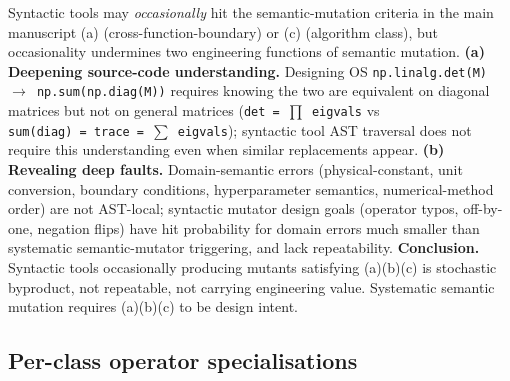 \documentclass[manuscript,screen,review]{acmart}
\begin{document}
Syntactic tools may \emph{occasionally} hit the semantic-mutation criteria in the main manuscript (a)
(cross-function-boundary) or (c) (algorithm class), but occasionality
undermines two engineering functions of semantic mutation. \textbf{(a)
Deepening source-code understanding.} Designing OS
\texttt{np.linalg.det(M)\ $\to$\ np.sum(np.diag(M))} requires knowing the
two are equivalent on diagonal matrices but not on general matrices
(\texttt{det\ =\ $\prod$\ eigvals} vs
\texttt{sum(diag)\ =\ trace\ =\ $\sum$\ eigvals}); syntactic tool AST
traversal does not require this understanding even when similar
replacements appear. \textbf{(b) Revealing deep faults.}
Domain-semantic errors (physical-constant, unit conversion, boundary
conditions, hyperparameter semantics, numerical-method order) are not
AST-local; syntactic mutator design goals (operator typos, off-by-one,
negation flips) have hit probability for domain errors much smaller than
systematic semantic-mutator triggering, and lack repeatability.
\textbf{Conclusion.} Syntactic tools occasionally producing mutants
satisfying (a)(b)(c) is stochastic byproduct, not repeatable, not
carrying engineering value. Systematic semantic mutation requires
(a)(b)(c) to be design intent.

\subsection{Per-class operator specialisations}\label{b.2-per-class-operator-specialisations}
\end{document}
